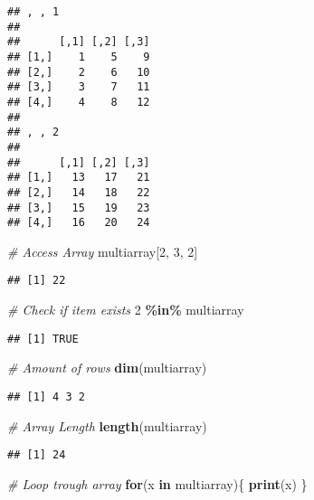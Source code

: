 \documentclass[
]{article}
\newenvironment{Shaded}{\begin{snugshade}}{\end{snugshade}}
\newcommand{\CommentTok}[1]{\textcolor[rgb]{0.56,0.35,0.01}{\textit{#1}}}
\newcommand{\ControlFlowTok}[1]{\textcolor[rgb]{0.13,0.29,0.53}{\textbf{#1}}}
\newcommand{\DecValTok}[1]{\textcolor[rgb]{0.00,0.00,0.81}{#1}}
\newcommand{\FunctionTok}[1]{\textcolor[rgb]{0.13,0.29,0.53}{\textbf{#1}}}
\newcommand{\NormalTok}[1]{#1}
\newcommand{\SpecialCharTok}[1]{\textcolor[rgb]{0.81,0.36,0.00}{\textbf{#1}}}
\begin{document}
\begin{verbatim}
## , , 1
## 
##      [,1] [,2] [,3]
## [1,]    1    5    9
## [2,]    2    6   10
## [3,]    3    7   11
## [4,]    4    8   12
## 
## , , 2
## 
##      [,1] [,2] [,3]
## [1,]   13   17   21
## [2,]   14   18   22
## [3,]   15   19   23
## [4,]   16   20   24
\end{verbatim}

\begin{Shaded}
\begin{Highlighting}[]
\CommentTok{\# Access Array}
\NormalTok{multiarray[}\DecValTok{2}\NormalTok{, }\DecValTok{3}\NormalTok{, }\DecValTok{2}\NormalTok{]}
\end{Highlighting}
\end{Shaded}

\begin{verbatim}
## [1] 22
\end{verbatim}

\begin{Shaded}
\begin{Highlighting}[]
\CommentTok{\# Check if item exists}
\DecValTok{2} \SpecialCharTok{\%in\%}\NormalTok{ multiarray}
\end{Highlighting}
\end{Shaded}

\begin{verbatim}
## [1] TRUE
\end{verbatim}

\begin{Shaded}
\begin{Highlighting}[]
\CommentTok{\# Amount of rows}
\FunctionTok{dim}\NormalTok{(multiarray)}
\end{Highlighting}
\end{Shaded}

\begin{verbatim}
## [1] 4 3 2
\end{verbatim}

\begin{Shaded}
\begin{Highlighting}[]
\CommentTok{\# Array Length}
\FunctionTok{length}\NormalTok{(multiarray)}
\end{Highlighting}
\end{Shaded}

\begin{verbatim}
## [1] 24
\end{verbatim}

\begin{Shaded}
\begin{Highlighting}[]
\CommentTok{\# Loop trough array}
\ControlFlowTok{for}\NormalTok{(x }\ControlFlowTok{in}\NormalTok{ multiarray)\{}
  \FunctionTok{print}\NormalTok{(x)}
\NormalTok{\}}
\end{Highlighting}
\end{Shaded}
\end{document}
